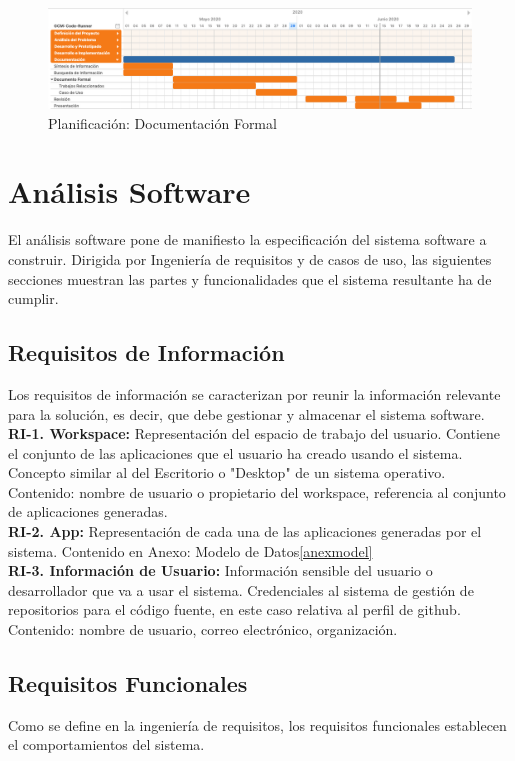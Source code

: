 \documentclass[a4paper,11pt]{book}
\begin{document}
\begin{figure}[H]
\centering
\includegraphics[scale=0.20]{imagenes/gant4.png}
\caption{ Planificación: Documentación Formal}
\end{figure}



\section{Análisis Software}

El análisis software pone de manifiesto la especificación del sistema software a construir. Dirigida por Ingeniería de requisitos y de casos de uso, las siguientes secciones muestran las partes y funcionalidades que el sistema resultante ha de cumplir.

\subsection{Requisitos de Información }
Los requisitos de información se caracterizan por reunir la información relevante para la solución, es decir, que debe gestionar y almacenar el sistema software.\\

\textbf{RI-1. Workspace:} Representación del espacio de trabajo del usuario. Contiene el conjunto de las aplicaciones que el usuario ha creado usando el sistema. Concepto similar al del Escritorio o "Desktop" de un sistema operativo.
Contenido: nombre de usuario o propietario del workspace, referencia al conjunto de aplicaciones generadas. \\
\textbf{RI-2. App:} Representación de cada una de las aplicaciones generadas por el sistema.
Contenido en Anexo: Modelo de Datos\ref{anexmodel}\\
\textbf{RI-3. Información de Usuario:} Información sensible del usuario o desarrollador que va a usar el sistema. Credenciales al sistema de gestión de repositorios para el código fuente, en este caso relativa al perfil de github.
Contenido: nombre de usuario, correo electrónico, organización. \\


\subsection{Requisitos Funcionales }
Como se define en la ingeniería de requisitos, los requisitos funcionales establecen el comportamientos del sistema.\\
\end{document}
